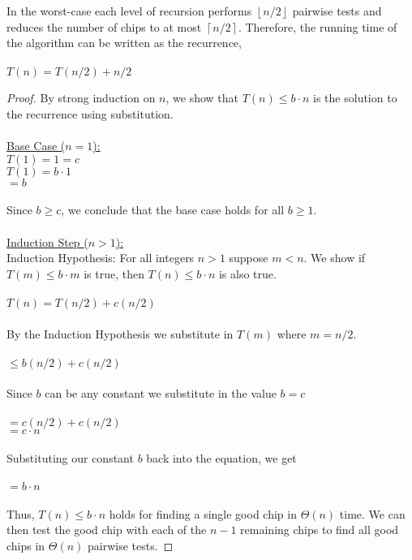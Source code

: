 \documentclass[11pt]{article}
\theoremstyle{nonumberplain}
\newtheorem{proof}{Proof}
\begin{document}
\begin{enumerate}
In the worst-case each level of recursion performs $\left \lfloor{n/2} \right \rfloor$ pairwise tests and reduces the number of chips to at most $\left \lceil{n/2} \right \rceil$. Therefore, the running time of the algorithm can be written as the recurrence, \\
\\
$T(n)=T(n/2)+n/2$
\begin{proof}
By strong induction on $n$, we show that $T(n) \le b \cdot n$ is the solution to the recurrence using substitution. \\
\\
\ul{Base Case ($n=1$):} \\
$T(1)=1=c$\\
$T(1)=b \cdot 1$\\
\phantom{T(1) }$=b$\\
\\
Since $b \geq c$, we conclude that the base case holds for all $b \geq 1$.\\
\\
\ul{Induction Step ($n>1$):}\\
Induction Hypothesis: For all integers $n>1$ suppose $m<n$. We show if $T(m) \le b \cdot m$ is true, then $T(n) \le b \cdot n$ is also true.\\
\\
$T(n)=T(n/2)+c(n/2)$\\
\\
By the Induction Hypothesis we substitute in $T(m)$ where $m=n/2$.\\
\\
\phantom{T(n) }$\le b(n/2)+c(n/2)$\\
\\
Since $b$ can be any constant we substitute in the value $b=c$\\
\\
\phantom{T(n) }$=c(n/2)+c(n/2)$\\
\phantom{T(n) }$=c \cdot n$\\
\\
Substituting our constant $b$ back into the equation, we get\\
\\
\phantom{T(n) }$=b \cdot n$\\
\\
Thus, $T(n) \le b \cdot n$ holds for finding a single good chip in $\Theta(n)$ time. We can then test the good chip with each of the $n-1$ remaining chips to find all good chips in $\Theta(n)$ pairwise tests.
\end{proof}
\end{enumerate}
\end{document}

